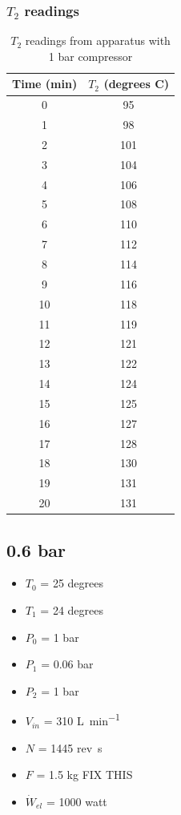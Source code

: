 \documentclass[class=article, crop=false, 12pt,a4paper]{standalone}
\numberwithin{equation}{section}
\begin{document}
\subsubsection{\(T_2\) readings} 
\begin{table}
  \centering
    \begin{tabular}{|c|c|}
      \hline
      Time (\si{\minute}) & \(T_2\) (degrees C)\\
      \hline
      0 & 95\\
      1 & 98\\
      2 & 101\\
      3 & 104\\
      4 & 106\\
      5 & 108\\
      6 & 110\\
      7 & 112\\
      8 & 114\\
      9 & 116\\
      10 & 118\\
      11 & 119\\
      12 & 121\\
      13 & 122\\
      14 & 124\\
      15 & 125\\
      16 & 127\\
      17 & 128\\
      18 & 130\\
      19 & 131\\
      20 & 131\\
      \hline
    \end{tabular}
  \caption{\(T_2\) readings from apparatus with 1 bar compressor}
  \label{table:1}
\end{table}
\subsection{0.6 bar}
\begin{multicols}{2}
  \begin{itemize}[noitemsep]
    \item \(T_0\) = 25 degrees
    \item \(T_1\) = 24 degrees
    \item \(P_0\) = 1 \si{\bar}
    \item \(P_1\) = 0.06 \si{\bar}
    \item \(P_2\) = 1 \si{\bar}
    \item \(V_{in}\) = 310 \si{\liter\per\minute}
    \item \(N\) = 1445 rev\si{\per\second}
    \item \(F\) = 1.5 \si{\kilogram} FIX THIS
    \item \(\dot{W}_{el}\) = 1000 \si{watt}
  \end{itemize}
\end{multicols}
\end{document}
